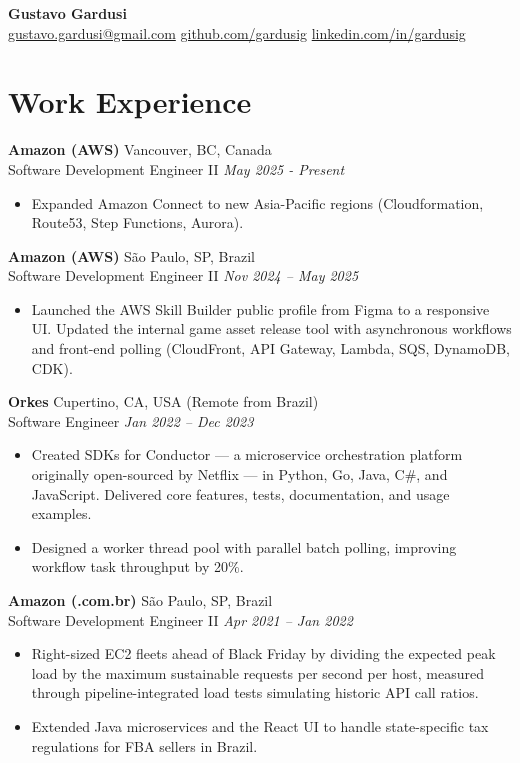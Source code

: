 \documentclass[a4paper,10pt]{article}
\begin{document}
\begin{center}
    {\LARGE \textbf{Gustavo Gardusi}} \\[0.5em]
    {\small \href{mailto:gustavo.gardusi@gmail.com}{gustavo.gardusi@gmail.com} \textbar \href{https://github.com/gardusig}{github.com/gardusig} \textbar \href{https://www.linkedin.com/in/gardusig}{linkedin.com/in/gardusig} }
\end{center}

\section*{Work Experience}

\textbf{Amazon (AWS)}
    \hfill Vancouver, BC, Canada
    \\ Software Development Engineer II 
    \hfill \textit{May 2025 - Present}
\begin{itemize}
    \item Expanded Amazon Connect to new Asia-Pacific regions (Cloudformation, Route53, Step Functions, Aurora).
\end{itemize}

\textbf{Amazon (AWS)}
    \hfill São Paulo, SP, Brazil 
    \\ Software Development Engineer II 
    \hfill \textit{Nov 2024 – May 2025}
\begin{itemize}
    \item Launched the AWS Skill Builder public profile from Figma to a responsive UI. Updated the internal game asset release tool with asynchronous workflows and front-end polling (CloudFront, API Gateway, Lambda, SQS, DynamoDB, CDK).
\end{itemize}

\textbf{Orkes}
    \hfill Cupertino, CA, USA (Remote from Brazil)
    \\ Software Engineer
    \hfill \textit{Jan 2022 – Dec 2023}
\begin{itemize}
    \item Created SDKs for Conductor — a microservice orchestration platform originally open-sourced by Netflix — in Python, Go, Java, C\#, and JavaScript. Delivered core features, tests, documentation, and usage examples.
    \item Designed a worker thread pool with parallel batch polling, improving workflow task throughput by 20\%. 
\end{itemize}

\textbf{Amazon (.com.br)}
    \hfill São Paulo, SP, Brazil 
    \\ Software Development Engineer II 
    \hfill \textit{Apr 2021 – Jan 2022}
\begin{itemize}
    \item Right-sized EC2 fleets ahead of Black Friday by dividing the expected peak load by the maximum sustainable requests per second per host, measured through pipeline-integrated load tests simulating historic API call ratios.
    \item Extended Java microservices and the React UI to handle state-specific tax regulations for FBA sellers in Brazil. 
\end{itemize}
\end{document}

